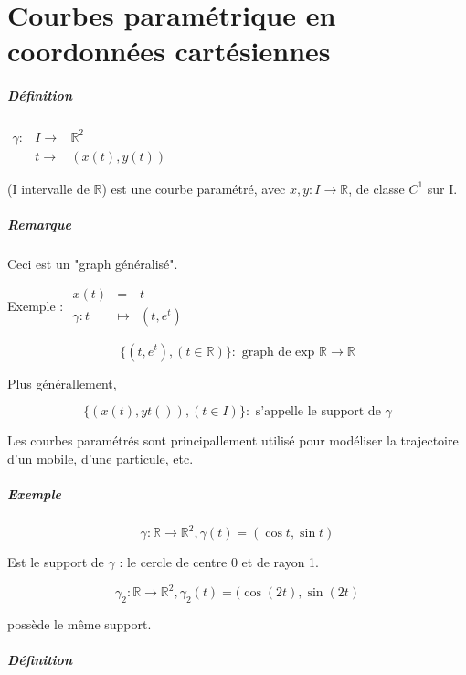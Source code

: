 \chapter{Courbes paramétrique en coordonnées cartésiennes}

\paragraph{Définition} $\begin{array}{rcl}
\gamma :& I \rightarrow& \mathbb{R}^2 \\
&t \rightarrow & (x(t), y(t))
\end{array}$ 

(I intervalle de $\mathbb{R}$) est une courbe paramétré, avec $x, y : I \rightarrow \mathbb{R}$, de classe $C^1$ sur I.

\paragraph{Remarque} Ceci est un "graph généralisé".

Exemple : 
$\begin{array}{rcl}
x(t) &=& t \\
\gamma : t & \mapsto & (t, e^t)\end{array}$

\[\{(t, e^t), (t \in \mathbb{R})\} : \text{ graph de exp } \mathbb{R} \rightarrow \mathbb{R}\]

Plus générallement, 

\[\{(x(t), yt()), (t \in I)\} : \text{ s'appelle le support de } \gamma\]

Les courbes paramétrés sont principallement utilisé pour modéliser la trajectoire d'un mobile, d'une particule, etc.

\paragraph{Exemple}

\[\gamma : \mathbb{R} \rightarrow \mathbb{R}^2, \gamma(t) = (\cos t, \sin t)\]

Est le support de $\gamma$ : le cercle de centre 0 et de rayon 1.

\[\gamma_2 : \mathbb{R} \rightarrow \mathbb{R}^2, \gamma_2(t) = (\cos(2t), \sin(2t)\]

possède le même support.

\paragraph{Définition}

